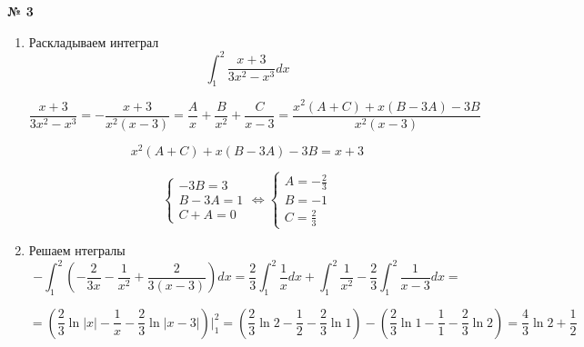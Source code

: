 \documentclass{article}
\begin{document}
\textbf{№ 3} 

\begin{enumerate}
\item Раскладываем интеграл
$$ \int_{1}^{2} \frac{x+3}{3x^2-x^3} dx $$

$$\frac{x+3}{3x^2-x^3}
=-\frac{x+3}{x^2(x-3)}
= \frac{A}{x} + \frac{B}{x^2} + \frac{C}{x-3} 
= \frac{x^2(A+C)+x(B-3A)-3B}{x^2(x-3)} $$

$$ x^2(A+C)+x(B-3A)-3B = x+3 $$

$$
\left\{
  \begin{array}{ccc}
    -3B = 3 \\
    B-3A = 1 \\
    C+A = 0
  \end{array}
\right.  
    \Leftrightarrow
\left\{
  \begin{array}{ccc}
    A = -\frac{2}{3} \\
    B = -1 \\
    C = \frac{2}{3}
  \end{array}
\right. 
$$

\item Решаем нтегралы
$$ -\int_{1}^{2} \left( -\frac{2}{3x} - \frac{1}{x^2} + \frac{2}{3(x-3)} \right) dx  
= \frac{2}{3}\int_{1}^{2} \frac{1}{x}dx + \int_{1}^{2}\frac{1}{x^2} - \frac{2}{3}\int_{1}^{2}\frac{1}{x-3} dx
= $$

$$ = \left( \frac{2}{3} \ln{\left| x \right|} - \frac{1}{x} - \frac{2}{3}\ln{\left| x-3 \right|} \right) \bigg\vert_{1}^{2}
= \left( \frac{2}{3} \ln{2} - \frac{1}{2} - \frac{2}{3}\ln{1} \right) - \left( \frac{2}{3} \ln{1} - \frac{1}{1} - \frac{2}{3}\ln{2} \right)
= \frac{4}{3} \ln{2} + \frac{1}{2} $$

\end{enumerate}
\end{document}
